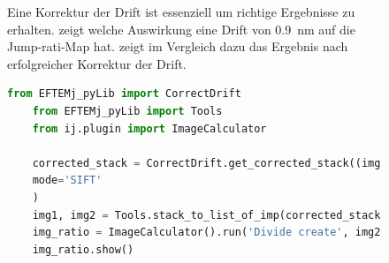 \documentclass[
	paper=a4,				%
	twoside=true,			%
	BCOR=6mm,				%
	fontsize=12pt,			%
	pagesize=auto,			%
	numbers=noenddot,		%
	bibliography=totoc,		%
	draft=false
]{scrartcl}
\begin{document}
\begin{figure}
	\centering
	\qquad
	\caption[Eine Korrektur der Drift ist essenziell um richtige Ergebnisse bei der Jump-ratio-Methode zu erhalten.]{Eine Korrektur der Drift ist essenziell um richtige Ergebnisse zu erhalten.  zeigt welche Auswirkung eine Drift von \SI{0,9}{nm} auf die Jump-rati-Map hat.  zeigt im Vergleich dazu das Ergebnis nach erfolgreicher Korrektur der Drift.}
	\label{fig:Jump-ratio-Drift}
\end{figure}

\begin{figure}
	\begin{lstlisting}[language=Python,caption={Die wichtigsten drei Zeilen Code bei der Berechnung der Jump-Ratio-Map.},label={lst:Jump-Ratio}]
	from EFTEMj_pyLib import CorrectDrift
	from EFTEMj_pyLib import Tools
	from ij.plugin import ImageCalculator
	
	corrected_stack = CorrectDrift.get_corrected_stack((img1_in, img2_in),
	mode='SIFT'
	)
	img1, img2 = Tools.stack_to_list_of_imp(corrected_stack)
	img_ratio = ImageCalculator().run('Divide create', img2, img1)
	img_ratio.show()
	\end{lstlisting}
\end{figure}
\end{document}

